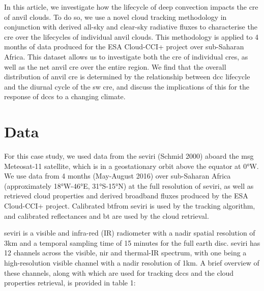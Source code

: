 In this article, we investigate how the lifecycle of deep convection
impacts the \acrshort{cre} of anvil clouds. To do so, we use a
novel cloud tracking methodology in conjunction with derived all-sky and
clear-sky radiative fluxes to characterise the \acrshort{cre} over the lifecycles
of individual anvil clouds. This methodology is applied to 4 months of
data produced for the ESA Cloud-CCI+ project over sub-Saharan Africa.
This dataset allows us to investigate both the \acrshort{cre} of individual \acrshort{cre}s,
as well as the net anvil \acrshort{cre} over the entire region. We find that the
overall distribution of anvil \acrshort{cre} is determined by the relationship
between \acrshort{dcc} lifecycle and the diurnal cycle of the \acrshort{sw} \acrshort{cre}, and discuss
the implications of this for the response of \acrshort{dcc}s to a changing climate.

\section{Data}

For this case study, we used data from the \acrshort{seviri} (Schmid 2000) aboard the \acrshort{msg} Meteosat-11 satellite, which is in a geostationary orbit above the equator at 0°W. 
We use data from 4 months (May-August 2016) over sub-Saharan Africa (approximately 18°W-46°E, 31°S-15°N) at the full resolution of \acrshort{seviri}, as well as retrieved cloud properties and derived broadband fluxes produced by the ESA Cloud-CCI+ project.
Calibrated \acrshort{bt}from \acrshort{seviri} is used by the tracking algorithm, and calibrated reflectances and \acrshort{bt} are used by the cloud retrieval.

\acrshort{seviri} is a visible and infra-red (IR) radiometer with a nadir spatial resolution of 3km and a temporal sampling time of 15 minutes for the full earth disc. 
\acrshort{seviri} has 12 channels across the visible, \acrshort{nir} and thermal-IR spectrum, with one being a high-resolution visible channel with a nadir resolution of 1km. 
A brief overview of these channels, along with which are used for tracking \acrshort{dcc}s and the cloud properties retrieval, is provided in table 1:

